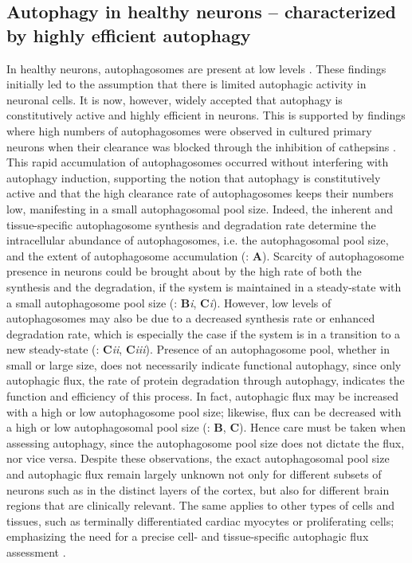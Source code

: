 \subsection{Autophagy in healthy neurons – characterized by highly efficient autophagy}
In healthy neurons, autophagosomes are present at low levels \citep{Boland2008,Mizushima2004a,Nixon2005}. These findings initially led to the assumption that there is limited autophagic activity in neuronal cells. It is now, however, widely accepted that autophagy is constitutively active and highly efficient in neurons. This is supported by findings where high numbers of autophagosomes were observed in cultured primary neurons when their clearance was blocked through the inhibition of cathepsins \citep{Boland2008}. This rapid accumulation of autophagosomes occurred without interfering with autophagy induction, supporting the notion that autophagy is constitutively active and that the high clearance rate of autophagosomes keeps their numbers low, manifesting in a small autophagosomal pool size. Indeed, the inherent and tissue-specific \citep{Mizushima2004a} autophagosome synthesis and degradation rate determine the intracellular abundance of autophagosomes, i.e. the autophagosomal pool size, and the extent of autophagosome accumulation (: \textbf{A}). Scarcity of autophagosome presence in neurons could be brought about by the high rate of both the synthesis and the degradation, if the system is maintained in a steady-state with a small autophagosome pool size (: \textbf{B}\textit{i}, \textbf{C}\textit{i}). However, low levels of autophagosomes may also be due to a decreased synthesis rate or enhanced degradation rate, which is especially the case if the system is in a transition to a new steady-state (: \textbf{C}\textit{ii}, \textbf{C}\textit{iii}). Presence of an autophagosome pool, whether in small or large size, does not necessarily indicate functional autophagy, since only autophagic flux, the rate of protein degradation through autophagy, indicates the function and efficiency of this process. In fact, autophagic flux may be increased with a high or low autophagosome pool size; likewise, flux can be decreased with a high or low autophagosomal pool size \citep{loos2014} (: \textbf{B}, \textbf{C}). Hence care must be taken when assessing autophagy, since the autophagosome pool size does not dictate the flux, nor vice versa. Despite these observations, the exact autophagosomal pool size and autophagic flux remain largely unknown not only for different subsets of neurons such as in the distinct layers of the cortex, but also for different brain regions that are clinically relevant. The same applies to other types of cells and tissues, such as terminally differentiated cardiac myocytes or proliferating cells; emphasizing the need for a precise cell- and tissue-specific autophagic flux assessment \citep{Kaizuka2016}.

